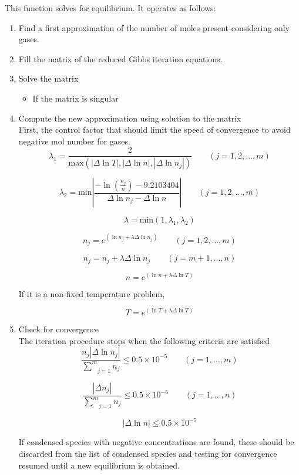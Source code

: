 \documentclass[10pt]{article}
\newcommand{\abs}[1]{\left|#1\right|}
\renewcommand{\exp}[1]{e^{#1}}
\begin{document}
This function solves for equilibrium.  It operates as follows: 
\begin{enumerate}
\item Find a first approximation of the number of moles present considering only
gases.
\item Fill the matrix of the reduced Gibbs iteration equations.
\item Solve the matrix
	\begin{itemize}
	\item If the matrix is singular
	\end{itemize}

\item Compute the new approximation using solution to the matrix \\
	
	First, the control factor that should limit the speed of
	convergence to avoid negative mol number for gases. \\
	$$\lambda_1 = \frac{2}{\text{max}(\abs{\Delta \ln{T}},
\abs{\Delta \ln{n}}, \abs{\Delta \ln{n_j}})} \qquad (j=1,2,...,m)$$ 	

	$$\lambda_2=\text{min}\abs{
\frac{-\ln{(\frac{n_j}{n})}-9.2103404}{\Delta \ln{n_j} - \Delta \ln{n}}}
\qquad (j=1,2,...,m)$$

	$$\lambda = \text{min}(1, \lambda_1, \lambda_2) $$

	$$n_j = \exp{( \ln{n_j} + \lambda \Delta \ln{n_j})} \qquad
(j=1,2,...,m)$$

	$$n_j = n_j + \lambda \Delta \ln{n_j} \qquad (j=m+1,...,n)$$

	$$ n = \exp{(\ln{n} + \lambda \Delta \ln{T})}$$

	If it is a non-fixed temperature problem,

	$$T = \exp{(\ln{T} + \lambda \Delta \ln{T})}$$

\item Check for convergence\\
	The iteration procedure stops when the following criteria are
satisfied\\

	$$\frac{n_j\abs{\Delta
\ln{n_j}}}{\underset{j=1}{\overset{m}{\sum}} n_j} \leq 0.5\times
10^{-5} \qquad (j=1,...,m)$$

	$$\frac{\abs{\Delta {n_j}}}{\underset{j=1}{\overset{m}{\sum}}
n_j} \leq 0.5\times 
10^{-5} \qquad (j=1,...,n)$$

	$$\abs{\Delta \ln{n}} \leq 0.5\times10^{-5}$$

	If condensed species with negative concentrations are found, these should be discarded 	from the list of condensed species and testing for convergence resumed until a new 	equilibrium is obtained.


\end{enumerate}
\end{document}
